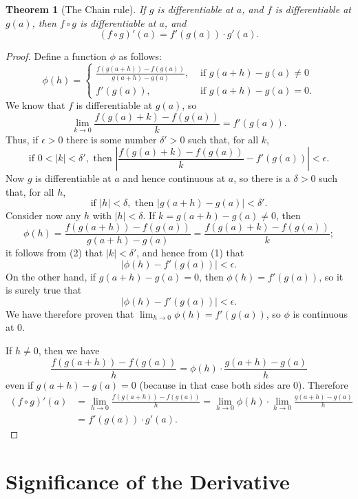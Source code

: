 \documentclass{article}
\numberwithin{corollary}{subsection}
\numberwithin{definition}{subsection}
\numberwithin{lemma}{subsection}
\newtheorem{theorem}{Theorem}
\numberwithin{theorem}{subsection}
\begin{document}
\begin{theorem}[The Chain rule]
  If $g$ is differentiable at $a$, and $f$ is differentiable at $g(a)$, then $f
  \circ g$ is differentiable at $a$, and \[
    (f \circ g)'(a) = f'(g(a)) \cdot g'(a).
  \]
\end{theorem}
\begin{proof}
  Define a function $\phi$ as follows: \[
    \phi(h) =
    \begin{cases}
      \frac{f(g(a + h)) - f(g(a))}{g(a + h) - g(a)}, &\text{ if } g(a + h) -
      g(a) \neq 0 \\
      f'(g(a)), &\text{ if } g(a + h) - g(a) = 0.
    \end{cases}
  \] We know that $f$ is differentiable at $g(a)$, so \[
    \lim_{k \to 0} \frac{f(g(a) + k) - f(g(a))}{k} = f'(g(a)).
  \] Thus, if $\epsilon > 0$ there is some number $\delta' > 0$ such that, for
  all $k$, \[ \tag{1}
    \text{if } 0 < |k| < \delta',
    \text{ then } \left| \frac{f(g(a) + k) - f(g(a))}{k} - f'(g(a)) \right|
    < \epsilon.
  \]
  Now $g$ is differentiable at $a$ and hence continuous at $a$, so there is a
  $\delta > 0$ such that, for all $h$, \[ \tag{2}
    \text{if } |h| < \delta, \text{ then } |g(a + h) - g(a)| < \delta'.
  \] Consider now any $h$ with $|h| < \delta$. If $k = g(a + h) - g(a) \neq 0$,
  then \[
    \phi(h)
    = \frac{f(g(a + h)) - f(g(a))}{g(a + h) - g(a)}
    = \frac{f(g(a) + k) - f(g(a))}{k};
  \] it follows from (2) that $|k| < \delta'$, and hence from (1) that \[
    |\phi(h) - f'(g(a))| < \epsilon.
  \] On the other hand, if $g(a + h) - g(a) = 0$, then $\phi(h) = f'(g(a))$, so
  it is surely true that \[
    |\phi(h) - f'(g(a))| < \epsilon.
  \] We have therefore proven that $\lim_{h \to 0} \phi(h) = f'(g(a))$, so
  $\phi$ is continuous at 0.

  If $h \neq 0$, then we have \[
    \frac{f(g(a + h)) - f(g(a))}{h} = \phi(h) \cdot \frac{g(a + h) - g(a)}{h}
  \] even if $g(a + h) - g(a) = 0$ (because in that case both sides are 0).
  Therefore \begin{align*}
    (f \circ g)'(a)
    &= \lim_{h \to 0} \frac{f(g(a + h)) - f(g(a))}{h}
    = \lim_{h \to 0} \phi(h) \cdot \lim_{h \to 0} \frac{g(a + h) - g(a)}{h} \\
    &= f'(g(a)) \cdot g'(a).
  \end{align*}
\end{proof}

\section{Significance of the Derivative}
\end{document}
